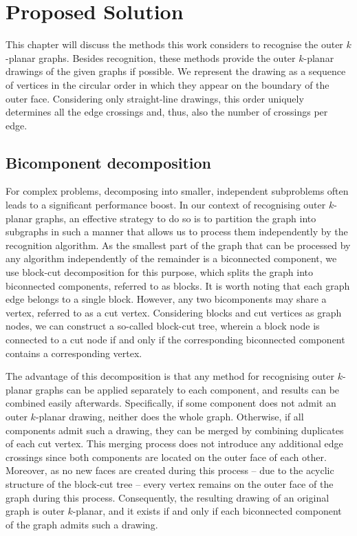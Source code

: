 \chapter{Proposed Solution}

This chapter will discuss the methods this work considers to recognise the outer \(k\)-planar graphs. Besides recognition, these methods provide the outer \(k\)-planar drawings of the given graphs if possible. We represent the drawing as a sequence of vertices in the circular order in which they appear on the boundary of the outer face. Considering only straight-line drawings, this order uniquely determines all the edge crossings and, thus, also the number of crossings per edge.


\section{Bicomponent decomposition}

For complex problems, decomposing into smaller, independent subproblems often leads to a significant performance boost. In our context of recognising outer \(k\)-planar graphs, an effective strategy to do so is to partition the graph into subgraphs in such a manner that allows us to process them independently by the recognition algorithm. As the smallest part of the graph that can be processed by any algorithm independently of the remainder is a biconnected component, we use block-cut decomposition for this purpose, which splits the graph into biconnected components, referred to as blocks. It is worth noting that each graph edge belongs to a single block. However, any two bicomponents may share a vertex, referred to as a cut vertex. Considering blocks and cut vertices as graph nodes, we can construct a so-called block-cut tree, wherein a block node is connected to a cut node if and only if the corresponding biconnected component contains a corresponding vertex.

The advantage of this decomposition is that any method for recognising outer \(k\)-planar graphs can be applied separately to each component, and results can be combined easily afterwards. Specifically, if some component does not admit an outer \(k\)-planar drawing, neither does the whole graph. Otherwise, if all components admit such a drawing, they can be merged by combining duplicates of each cut vertex. This merging process does not introduce any additional edge crossings since both components are located on the outer face of each other. Moreover, as no new faces are created during this process -- due to the acyclic structure of the block-cut tree -- every vertex remains on the outer face of the graph during this process. Consequently, the resulting drawing of an original graph is outer \(k\)-planar, and it exists if and only if each biconnected component of the graph admits such a drawing.


